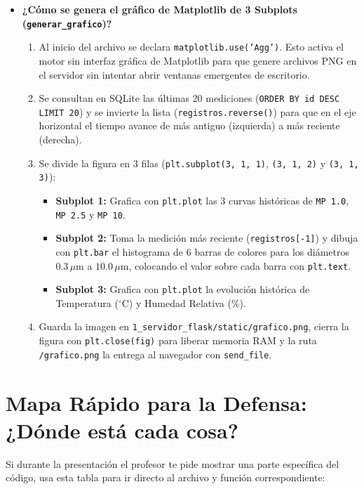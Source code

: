 \documentclass[11pt,a4paper]{article}
\begin{document}
\begin{itemize}[leftmargin=1.5em]
    \item \textbf{¿Cómo se genera el gráfico de Matplotlib de 3 Subplots (\texttt{generar\_grafico})?}
    \begin{enumerate}
        \item Al inicio del archivo se declara \texttt{matplotlib.use('Agg')}. Esto activa el motor sin interfaz gráfica de Matplotlib para que genere archivos PNG en el servidor sin intentar abrir ventanas emergentes de escritorio.
        \item Se consultan en SQLite las últimas 20 mediciones (\texttt{ORDER BY id DESC LIMIT 20}) y se invierte la lista (\texttt{registros.reverse()}) para que en el eje horizontal el tiempo avance de más antiguo (izquierda) a más reciente (derecha).
        \item Se divide la figura en 3 filas (\texttt{plt.subplot(3, 1, 1)}, \texttt{(3, 1, 2)} y \texttt{(3, 1, 3)}):
        \begin{itemize}
            \item \textbf{Subplot 1:} Grafica con \texttt{plt.plot} las 3 curvas históricas de \texttt{MP 1.0}, \texttt{MP 2.5} y \texttt{MP 10}.
            \item \textbf{Subplot 2:} Toma la medición más reciente (\texttt{registros[-1]}) y dibuja con \texttt{plt.bar} el histograma de 6 barras de colores para los diámetros $0.3\,\mu\text{m}$ a $10.0\,\mu\text{m}$, colocando el valor sobre cada barra con \texttt{plt.text}.
            \item \textbf{Subplot 3:} Grafica con \texttt{plt.plot} la evolución histórica de Temperatura ($^\circ\text{C}$) y Humedad Relativa ($\%$).
        \end{itemize}
        \item Guarda la imagen en \texttt{1\_servidor\_flask/static/grafico.png}, cierra la figura con \texttt{plt.close(fig)} para liberar memoria RAM y la ruta \texttt{/grafico.png} la entrega al navegador con \texttt{send\_file}.
    \end{enumerate}
\end{itemize}

\newpage
\section{Mapa Rápido para la Defensa: ¿Dónde está cada cosa?}

Si durante la presentación el profesor te pide mostrar una parte específica del código, usa esta tabla para ir directo al archivo y función correspondiente:
\end{document}
